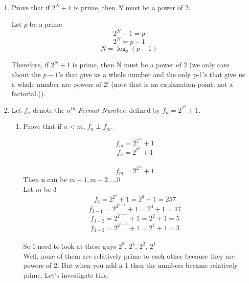 \documentclass[10pt, AMS Euler]{article}
\begin{document}
	
	\\
    \\
	
	\noindent \underline{\hspace{2in}}\\
	
	\\
	
	
	
	
	\begin{enumerate}

        
		\newpage
		\item Prove that if $2^N +1$ is prime, then $N$ must be a power of $2$.

            Let $p$ be a prime
            $$ 2^N + 1 = p $$
            $$ 2^N = p - 1 $$
            $$ N = \log_2{(p - 1)} $$

            Therefore, if $2^N +1$ is prime, then N must be a power of $2$ (we only care about the $p-1$'s that give us a whole number and the only p-1's that give us a whole number are powers of $2$! (note that is an explanation-point, not a factorial.)).


        \newpage
		\item Let $f_n$ denote the $n^{\mbox{th}}$ \emph{Fermat Number}, defined by $f_n = 2^{2^n}+1$.  
		\begin{enumerate}
			\item Prove that if $n < m$, $f_n \perp f_m$.

                $$ f_m = 2^{2^m}+1 $$
                $$ f_n = 2^{2^n}+1 $$ \\

                $$ f_m = 2^{2^m}+1 $$
                Then n can be $m-1, m-2, ... 0$ \\

                Let $m$ be $3$
                $$ f_3 = 2^{2^3}+1 = 2^8 + 1 = 257 $$
                $$ f_{3-1} = 2^{2^{3-1}}+1 = 2^4 + 1 = 17 $$
                $$ f_{3-2} = 2^{2^{3-2}}+1 = 2^2 + 1 = 5 $$
                $$ f_{3-3} = 2^{2^{3-3}}+1 = 2^1 + 1 = 3 $$ \\

                So I need to look at these guys $2^8$, $2^4$, $2^2$, $2^1$ \\

                Well, none of them are relatively prime to each other because they are powers of 2. But when you add a 1 then the numbers became relatively prime. Let's investigate this. \\


\end{enumerate}
\end{enumerate}
\end{document}
